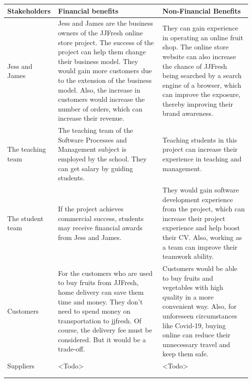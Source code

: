 \documentclass{report}
\begin{document}
\clearpage
\begin{tabularx}{0.95\linewidth}{%
  >{\raggedright\arraybackslash}l%
  >{\raggedright\arraybackslash}X%
  >{\raggedright\arraybackslash}X}
  \toprule
  Stakeholders & Financial benefits & Non-Financial Benefits \\
  \midrule
  Jess and James
  & Jess and James are the business owners of the JJFresh online store project. The success of the project can help them change their business model. They would gain more customers due to the extension of the business model. Also, the increase in customers would increase the number of orders, which can increase their revenue.
  & They can gain experience in operating an online fruit shop. The online store website can also increase the chance of JJFresh being searched by a search engine of a browser, which can improve the exposure, thereby improving their brand awareness. 
  \\
  \midrule
  The teaching team
  & The teaching team of the Software Processes and Management subject is employed by the school. They can get salary by guiding students.
  & Teaching students in this project can increase their experience in teaching and management.
  \\
  \midrule
  The student team
  & If the project achieves commercial success, students may receive financial awards from Jess and James.
  & They would gain software development experience from the project, which can increase their project experience and help boost their CV. Also, working as a team can improve their teamwork ability.
  \\
  \midrule
  Customers
  & For the customers who are used to buy fruits from JJFresh, home delivery can save them time and money. They don't need to spend money on transportation to jjfresh. Of course, the delivery fee must be considered. But it would be a trade-off.
  & Customers would be able to buy fruits and vegetables with high quality in a more convenient way. Also, for unforeseen circumstances like Covid-19, buying online can reduce their unnecessary travel and keep them safe.
  \\
  \midrule
  Suppliers
  & <Todo>
  & <Todo>
  \\
  \bottomrule
  \\
  \caption{Business Value}  
  \label{tab:businessValue}
\end{tabularx}
\end{document}
